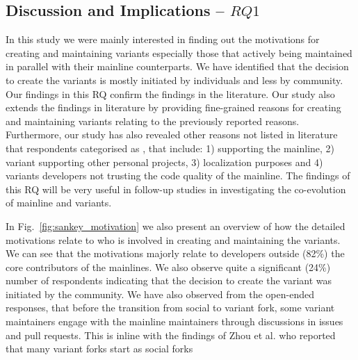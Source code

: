 \subsection{Discussion and Implications -- $RQ1$}
In this study we were mainly interested in finding out the motivations for creating and maintaining variants especially those that actively being maintained in parallel with their mainline counterparts.
We have identified that the decision to create the variants is mostly initiated by individuals and less by community.
Our findings in this RQ confirm the findings in the literature.
Our study also extends the findings in literature by providing fine-grained reasons for creating and maintaining variants relating to the previously reported reasons.
Furthermore, our study has also revealed other reasons not listed in literature that respondents categorised as , that include: 1) supporting the mainline, 2) variant supporting other personal projects, 3) localization purposes and 4) variants developers not trusting the code quality of the mainline.
The findings of this RQ will be very useful in follow-up studies in investigating the co-evolution of mainline and variants.

In Fig.~\ref{fig:sankey_motivation} we also present an overview of how the detailed motivations relate to who is involved in creating and maintaining the variants. We can see that the motivations majorly relate to developers outside (82\%) the core contributors of the mainlines. We also observe quite a significant (24\%) number of respondents indicating that the decision to create the variant was initiated by the community. We have also observed from the open-ended responses, that before the transition from social to variant fork, some variant maintainers engage with the mainline maintainers through discussions in issues and pull requests. This is inline with the findings of Zhou et al. who reported that many variant forks start as social forks~\cite{Zhou:2020}

